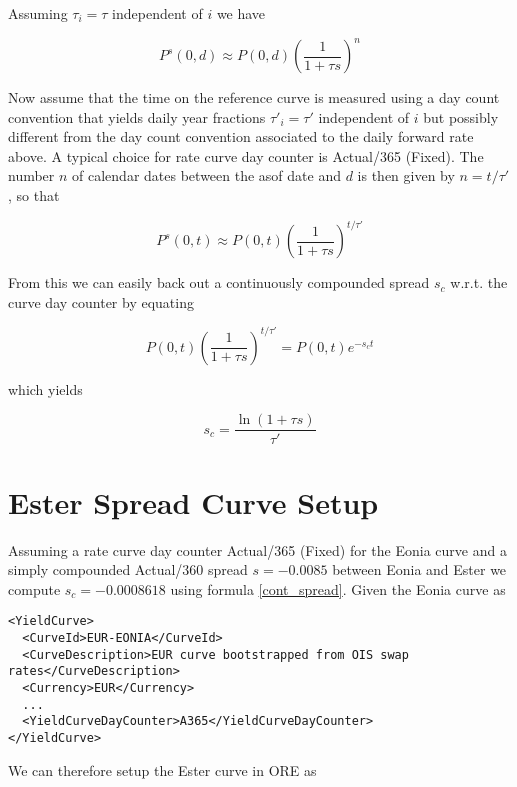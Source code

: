 \documentclass[12pt, a4paper]{article}
\begin{document}
Assuming $\tau_i = \tau$ independent of $i$ we have

\begin{equation}
  P^s(0,d) \approx P(0,d) \left( \frac{1}{1+\tau s} \right)^n
\end{equation}

Now assume that the time on the reference curve is measured using a day count convention that yields daily year
fractions $\tau'_i = \tau'$ independent of $i$ but possibly different from the day count convention associated to the
daily forward rate above. A typical choice for rate curve day counter is Actual/365 (Fixed). The number $n$ of calendar
dates between the asof date and $d$ is then given by $n = t / \tau'$, so that

\begin{equation}
  P^s(0,t) \approx P(0,t) \left( \frac{1}{1+\tau s} \right)^{t / \tau'}
\end{equation}

From this we can easily back out a continuously compounded spread $s_c$ w.r.t. the curve day counter by equating

\begin{equation}
  P(0,t) \left( \frac{1}{1+\tau s} \right)^{t / \tau'} = P(0,t) e^{-s_c t} 
\end{equation}

which yields

\begin{equation}\label{cont_spread}
 s_c = \frac{\ln (1+\tau s)}{\tau'}
\end{equation}

\section{Ester Spread Curve Setup}

Assuming a rate curve day counter Actual/365 (Fixed) for the Eonia curve and a simply compounded Actual/360 spread
$s = -0.0085$ between Eonia and Ester we compute $s_c = -0.0008618$ using formula \ref{cont_spread}. Given the Eonia curve as

\begin{verbatim}
<YieldCurve>
  <CurveId>EUR-EONIA</CurveId>
  <CurveDescription>EUR curve bootstrapped from OIS swap rates</CurveDescription>
  <Currency>EUR</Currency>
  ...
  <YieldCurveDayCounter>A365</YieldCurveDayCounter>
</YieldCurve>
\end{verbatim}

We can therefore setup the Ester curve in ORE as
\end{document}
